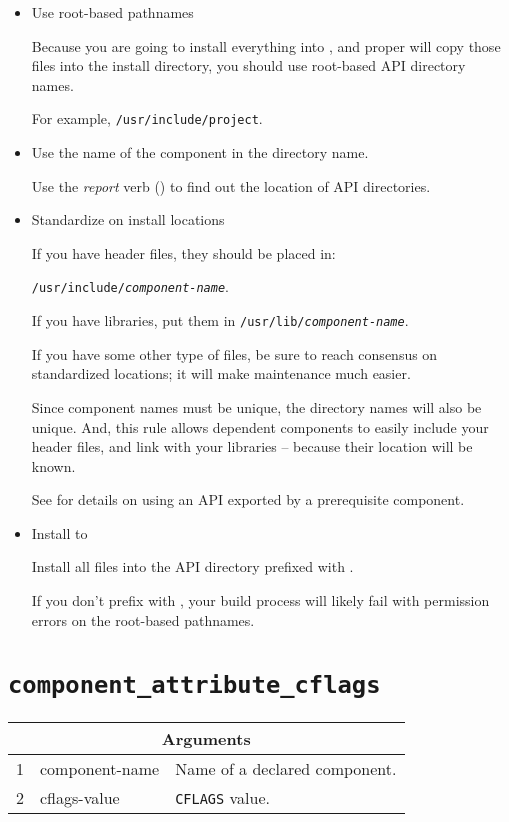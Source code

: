 \begin{itemize}
\item Use root-based pathnames

  Because you are going to install everything into \destdir, and
  \lmsbw proper will copy those files into the install directory,
  you should use root-based API directory names.

  For example, \texttt{/usr/include/project}.

\item Use the name of the component in the directory name.

  Use the \emph{report} verb () to find out
  the location of API directories.

\item Standardize on install locations

  If you have header files, they should be placed in:

  \texttt{/usr/include/\emph{component-name}}.

  If you have libraries, put them in
  \texttt{/usr/lib/\emph{component-name}}.

  If you have some other type of files, be sure to reach consensus
  on standardized locations; it will make maintenance much easier.

  Since component names must be unique, the directory names will
  also be unique.  And, this rule allows dependent components to
  easily include your header files, and link with your libraries
  -- because their location will be known.

  See  for details on using an API
  exported by a prerequisite component.

\item Install to \destdir

  Install all files into the API directory prefixed with \destdir.

  If you don't prefix with \destdir, your build process will
  likely fail with permission errors on the root-based pathnames.

\end{itemize}

\section{\texttt{component\_attribute\_cflags}}\label{api:cflags}

\begin{tabularx}{\linewidth}{ll|X}
  \multicolumn{3}{c}{\textbf{Arguments}} \\ \hline

  1 & component-name & Name of a declared component. \\
  2 & cflags-value & \texttt{CFLAGS} value.
\end{tabularx}

